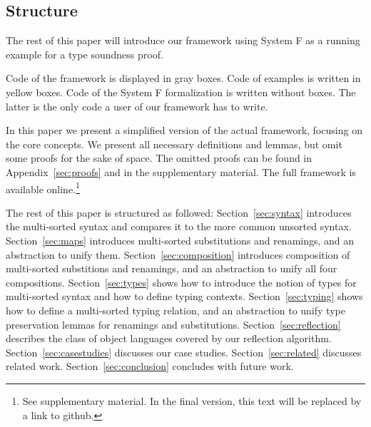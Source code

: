 \documentclass[a4paper, UKenglish, cleveref, autoref, thm-restate]{lipics-v2021}
\begin{document}
  \subsection{Structure}
  \label{sec:introduction:structure}

  The rest of this paper will introduce our framework using System F
  as a running example for a type soundness proof.

  Code of the framework is displayed in gray boxes.
  Code of examples is written in yellow boxes.
  Code of the System F formalization is written without boxes. The
  latter is the only code a user of our framework has to write.

  In this paper we present a simplified version of the actual
  framework, focusing on the core concepts. We present all necessary
  definitions and lemmas, but omit some proofs for the sake of
  space. The omitted proofs can be found in Appendix~\ref{sec:proofs}
  and in the supplementary material.
  The full framework is available online.\footnote{See supplementary material. In the final version, this text will be replaced by a link to github.}

  The rest of this paper is structured as followed:
  Section~\ref{sec:syntax} introduces the multi-sorted syntax and compares it to the
  more common unsorted syntax.
  Section~\ref{sec:maps} introduces multi-sorted substitutions and renamings, and
  an abstraction to unify them.
  Section~\ref{sec:composition} introduces composition of multi-sorted
  substitions and renamings, and an abstraction to unify all four
  compositions.
  Section~\ref{sec:types} shows how to introduce the notion of types
  for multi-sorted syntax and how to define typing contexts.
  Section~\ref{sec:typing} shows how to define a multi-sorted typing relation,
  and an abstraction to unify type preservation lemmas for renamings and substitutions.
  Section~\ref{sec:reflection} describes the class of object languages covered by
  our reflection algorithm.
  Section~\ref{sec:casestudies} discusses our case studies.
  Section~\ref{sec:related} discusses related work.
  Section~\ref{sec:conclusion} concludes with future work.
\end{document}
